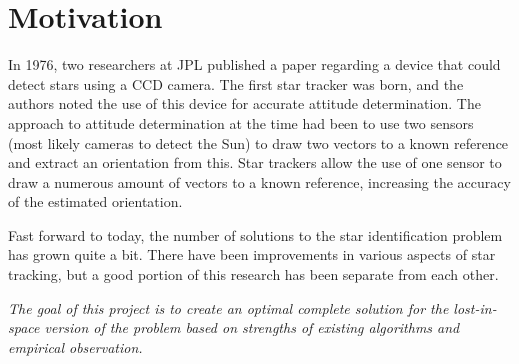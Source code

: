 \section{Motivation} 

In 1976, two researchers at JPL published a paper regarding a device that could
detect stars using a CCD camera. The first star tracker was born, and the
authors noted the use of this device for accurate attitude determination. The
approach to attitude determination at the time had been to use two sensors (most
likely cameras to detect the Sun) to draw two vectors to a known reference and
extract an orientation from this. Star trackers allow the use of one sensor to
draw a numerous amount of vectors to a known reference, increasing the accuracy
of the estimated orientation.

Fast forward to today, the number of solutions to the star identification
problem has grown quite a bit. There have been improvements in various aspects
of star tracking, but a good portion of this research has been separate from
each other.

\textit{The goal of this project is to create an optimal complete 
solution for the lost-in-space version of the problem based on strengths of
existing algorithms and empirical observation.} 